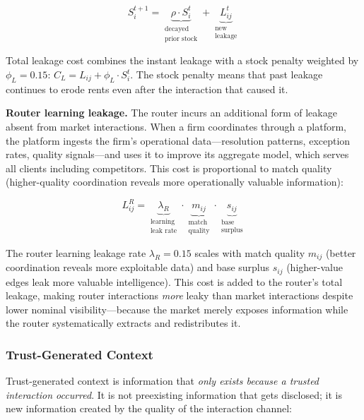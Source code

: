 \documentclass[12pt]{article}
\theoremstyle{definition}
\begin{document}
\begin{equation}
\label{eq:leakstock}
S_i^{t+1} = \underbrace{\rho \cdot S_i^t}_{\substack{\text{decayed} \\ \text{prior stock}}} + \underbrace{L_{ij}^t}_{\substack{\text{new} \\ \text{leakage}}}
\end{equation}

\noindent Total leakage cost combines the instant leakage with a stock penalty weighted by $\phi_L = 0.15$: $C_L = L_{ij} + \phi_L \cdot S_i^t$. The stock penalty means that past leakage continues to erode rents even after the interaction that caused it.

\textbf{Router learning leakage.} The router incurs an additional form of leakage absent from market interactions. When a firm coordinates through a platform, the platform ingests the firm's operational data---resolution patterns, exception rates, quality signals---and uses it to improve its aggregate model, which serves all clients including competitors. This cost is proportional to match quality (higher-quality coordination reveals more operationally valuable information):

\begin{equation}
\label{eq:routerleak}
L^R_{ij} = \underbrace{\lambda_R}_{\substack{\text{learning} \\ \text{leak rate}}} \cdot \underbrace{m_{ij}}_{\substack{\text{match} \\ \text{quality}}} \cdot \underbrace{s_{ij}}_{\substack{\text{base} \\ \text{surplus}}}
\end{equation}

\noindent The router learning leakage rate $\lambda_R = 0.15$ scales with match quality $m_{ij}$ (better coordination reveals more exploitable data) and base surplus $s_{ij}$ (higher-value edges leak more valuable intelligence). This cost is added to the router's total leakage, making router interactions \textit{more} leaky than market interactions despite lower nominal visibility---because the market merely exposes information while the router systematically extracts and redistributes it.

\subsubsection{Trust-Generated Context}
\label{sec:trust}

Trust-generated context is information that \textit{only exists because a trusted interaction occurred}. It is not preexisting information that gets disclosed; it is new information created by the quality of the interaction channel:
\end{document}
